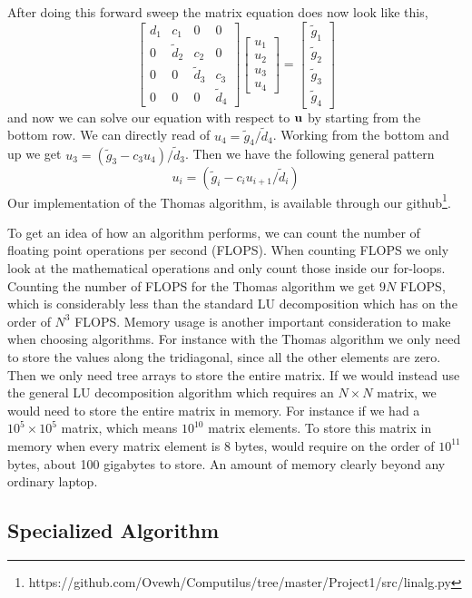 After doing this forward sweep the matrix equation does now look like this,
\begin{equation*}
  \begin{bmatrix}
    d_1 & c_1 & 0 & 0 \\
    0 & \tilde{d}_2 & c_2 & 0 \\
    0 & 0 & \tilde{d}_3 & c_3  \\
    0 & 0 & 0 & \tilde{d}_4 
  \end{bmatrix} \begin{bmatrix}
    u_1 \\ u_2 \\ u_3 \\ u_4
  \end{bmatrix} = \begin{bmatrix}
    \tilde{g}_1 \\ \tilde{g}_2 \\ \tilde{g}_3 \\ \tilde{g}_4
  \end{bmatrix}
\end{equation*}
and now we can solve our equation with respect to $\mathbf{u}$ by starting from
the bottom row. We can directly read of $u_4 = \tilde{g}_4 / \tilde{d}_4$.
Working from the bottom and up we get $u_3 = \left(\tilde{g}_3-c_3
u_4\right)/\tilde{d}_3$. Then we have the following general pattern
\begin{equation}
  u_i = \left(\tilde{g}_i - c_i u_{i+1}/\tilde{d}_i \right)
\end{equation}  
Our implementation of the Thomas algorithm, is available
through our github\footnote{https://github.com/Ovewh/Computilus/tree/master/Project1/src/linalg.py}.


To get an idea of how an algorithm performs, we can count
the number of floating point operations per second (FLOPS). When counting FLOPS
we only look at the mathematical operations and only count those inside our
for-loops. Counting the number of FLOPS for the Thomas algorithm we get $9N$
FLOPS, which is considerably less than the standard LU decomposition which has
on the order of $N^3$ FLOPS.   
Memory usage is another important consideration to make when choosing
algorithms. For instance with the Thomas algorithm we only need to store the
values along the tridiagonal, since all the other elements are zero. Then we only need tree arrays to store the entire matrix. If we
would instead use the general LU decomposition algorithm which requires an $N
\times N$ matrix, we would need to store the entire matrix in memory. For
instance if we had a $10^5 \times 10^5$ matrix, which means $10^10$ matrix
elements. To store this matrix in memory when
every matrix element is 8 bytes, would require on the order of $10^{11}$
bytes, about 100 gigabytes to store. An amount of memory clearly beyond any
ordinary laptop. 

\subsection*{Specialized Algorithm}


